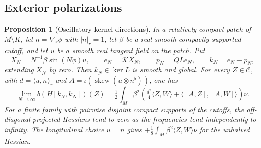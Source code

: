 \documentclass[11pt]{article}
\numberwithin{equation}{section}
\newtheorem{proposition}[theorem]{Proposition}
\theoremstyle{definition}
\theoremstyle{remark}
\begin{document}
\subsection{Exterior polarizations}

\begin{proposition}[Oscillatory kernel directions]\label{mscone:probe}
In a relatively compact patch of \(M\setminus K\), let
\(n=\nabla_r\phi\) with \(|n|_r=1\), let \(\beta\) be a real smooth
compactly supported cutoff, and let \(u\) be a smooth real tangent
field on the patch. Put
\[
 X_N=N^{-1}\beta\sin(N\phi)u,\qquad e_N=\mathcal K X_N,\qquad
 p_N=QLe_N,\qquad k_N=e_N-p_N ,
\]
extending \(X_N\) by zero. Then \(k_N\in\ker L\) is smooth and
global. For every \(Z\in\mathcal C\), with
\(d=\langle u,n\rangle_r\) and
\(A=\iota(\operatorname{skew}(u\otimes n^\flat))\), one has
\begin{equation}\label{mscone:probeformula}
 \lim_{N\to\infty} b(H[k_N,k_N])(Z)
 =\tfrac12\int_M\beta^2\!
       \left(\tfrac{d^2}{4}\langle Z,W\rangle
             +\langle[A,Z],[A,W]\rangle\right)\nu .
\end{equation}
For a finite family with pairwise disjoint compact supports of the
cutoffs, the off-diagonal projected Hessians tend to zero as the
frequencies tend independently to infinity. The longitudinal
choice \(u=n\) gives \(+\tfrac18\int_M\beta^2\langle Z,W\rangle\nu\)
for the unhalved Hessian.
\end{proposition}
\end{document}
